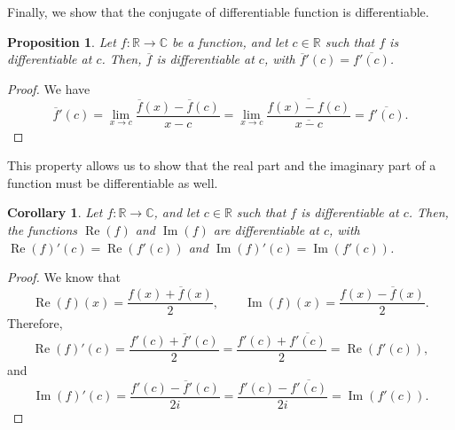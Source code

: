 \documentclass[a4paper, openany]{memoir}
\theoremstyle{definition}
\theoremstyle{plain}
\newtheorem{proposition}[definition]{Proposition}
\newtheorem{corollary}[definition]{Corollary}
\begin{document}
\noindent Finally, we show that the conjugate of differentiable function is differentiable.
\begin{proposition}
Let $f: \mathbb{R} \to \mathbb{C}$ be a function, and let $c \in \mathbb{R}$ such that $f$ is differentiable at $c$. Then, $\overline{f}$ is differentiable at $c$, with $\overline{f}'(c) = \overline{f'(c)}$.
\end{proposition}
\begin{proof}
We have
\[\overline{f}'(c) = \lim_{x \to c} \frac{\overline{f}(x) - \overline{f}(c)}{x - c} = \lim_{x \to c} \frac{\overline{f(x) - f(c)}}{\overline{x - c}} = \overline{f'(c)}.\]
\end{proof}
\noindent This property allows us to show that the real part and the imaginary part of a function must be differentiable as well.
\begin{corollary}
Let $f: \mathbb{R} \to \mathbb{C}$, and let $c \in \mathbb{R}$ such that $f$ is differentiable at $c$. Then, the functions $\operatorname{Re}(f)$ and $\operatorname{Im}(f)$ are differentiable at $c$, with $\operatorname{Re}(f)'(c) = \operatorname{Re}(f'(c))$ and $\operatorname{Im}(f)'(c) = \operatorname{Im}(f'(c))$.
\end{corollary}
\begin{proof}
We know that
\[\operatorname{Re}(f)(x) = \frac{f(x) + \overline{f}(x)}{2}, \qquad \operatorname{Im}(f)(x) = \frac{f(x) - \overline{f}(x)}{2}.\]
Therefore,
\[\operatorname{Re}(f)'(c) = \frac{f'(c) + \overline{f}'(c)}{2} = \frac{f'(c) + \overline{f'(c)}}{2} = \operatorname{Re}(f'(c)),\]
and 
\[\operatorname{Im}(f)'(c) = \frac{f'(c) - \overline{f}'(c)}{2i} = \frac{f'(c) - \overline{f'(c)}}{2i} = \operatorname{Im}(f'(c)).\]
\end{proof}
\end{document}
